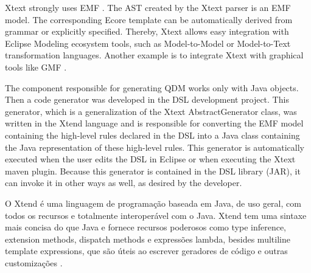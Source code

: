 Xtext strongly uses EMF \cite{blewitt2013}. The AST created by the Xtext parser is an EMF model. The corresponding Ecore template can be automatically derived from grammar or explicitly specified. Thereby, Xtext allows easy integration with Eclipse Modeling ecosystem tools, such as Model-to-Model or Model-to-Text transformation languages. Another example is to integrate Xtext with graphical tools like GMF \cite{eysholdt2010}.


The component responsible for generating QDM works only with Java objects. Then a code generator was developed in the DSL development project. This generator, which is a generalization of the Xtext AbstractGenerator class, was written in the Xtend language and is responsible for converting the EMF model containing the high-level rules declared in the DSL into a Java class containing the Java representation of these high-level rules. This generator is automatically executed when the user edits the DSL in Eclipse or when executing the Xtext maven plugin. Because this generator is contained in the DSL library (JAR), it can invoke it in other ways as well, as desired by the developer.



O Xtend é uma linguagem de programação baseada em Java, de uso geral, com todos os recursos e totalmente interoperável com o Java. Xtend tem uma sintaxe mais concisa do que Java e fornece recursos poderosos como type inference, extension methods, dispatch methods e expressões lambda, besides multiline template expressions, que são úteis ao escrever geradores de código e outras customizações \cite{bettini2016}.





